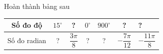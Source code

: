 \begin{bt}%
	Hoàn thành bảng sau
	\begin{center}
	\renewcommand{\arraystretch}{2}
	\begin{tabular}{|c|c|c|c|c|c|l|}
	\hline
	Số đo độ     & $15^\circ$ & ? & $0^\circ$ & $900^\circ$ & ? & ?  \\ \hline
	Số đo radian & ?  & $\dfrac{3\pi}{8}$ & ? & ?   & $-\dfrac{7\pi}{12}$ & $-\dfrac{11\pi}{8}$ \\ \hline
	\end{tabular}
	\end{center}
\end{bt}

